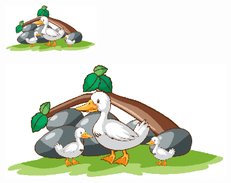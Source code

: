 \documentclass[12pt]{article}
\begin{document}
\begin{center}
	\includegraphics[width=4cm]{figures/image1.eps}
\end{center}

\begin{center}
	\includegraphics[height=5cm]{figures/image1.eps}
\end{center}
\end{document}
